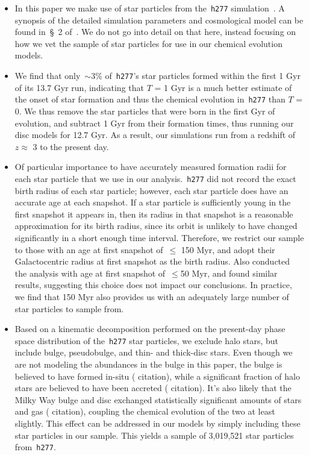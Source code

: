 \documentclass[fleqn, usenatbib]{mnras}
\begin{document}
\begin{itemize} 
	\item In this paper we make use of star particles from the~\texttt{h277} 
	simulation~\citep{Christensen2012, Zolotov2012, Loebman2012, Loebman2014, 
	Brooks2014}. A synopsis of the detailed simulation parameters and 
	cosmological model can be found in~\S~2 of~\citet{Bird2020}. We do not 
	go into detail on that here, instead focusing on how we vet the sample of 
	star particles for use in our chemical evolution models. 

	\item We find that only~$\sim$3\% of~\texttt{h277}'s star particles formed 
	within the first 1 Gyr of its 13.7 Gyr run, indicating that $T$ = 1 Gyr 
	is a much better estimate of the onset of star formation and thus the 
	chemical evolution in~\texttt{h277} than $T$ = 0. We thus remove the star 
	particles that were born in the first Gyr of evolution, and subtract 1 Gyr 
	from their formation times, thus running our disc models for 12.7 Gyr. As 
	a result, our simulations run from a redshift of~$z \approx$ 3 to the 
	present day. 

	\item Of particular importance to have accurately measured formation radii 
	for each star particle that we use in our analysis.~\texttt{h277} did not 
	record the exact birth radius of each star particle; however, each star 
	particle does have an accurate age at each snapshot. If a star particle 
	is sufficiently young in the first snapshot it appears in, then its 
	radius in that snapshot is a reasonable approximation for its birth 
	radius, since its orbit is unlikely to have changed significantly in a 
	short enough time interval. Therefore, we restrict our sample to those 
	with an age at first snapshot of~$\leq$ 150 Myr, and adopt their 
	Galactocentric radius at first snapshot as the birth radius. Also 
	conducted the analysis with age at first snapshot of~$\leq$50 Myr, and 
	found similar results, suggesting this choice does not impact our 
	conclusions. In practice, we find that 150 Myr also provides us with an 
	adequately large number of star particles to sample from. 

	\item Based on a kinematic decomposition performed on the present-day 
	phase space distribution of the~\texttt{h277} star particles, we exclude 
	halo stars, but include bulge, pseudobulge, and thin- and thick-disc 
	stars. Even though we are not modeling the abundances in the bulge in this 
	paper, the bulge is believed to have formed in-situ ({\color{red} 
	citation}), while a significant fraction of halo stars are believed to 
	have been accreted ({\color{red} citation}). It's also likely that the 
	Milky Way bulge and disc exchanged statistically significant amounts of 
	stars and gas ({\color{red} citation}), coupling the chemical evolution of 
	the two at least slightly. This effect can be addressed in our models by 
	simply including these star particles in our sample. This yields a sample 
	of 3,019,521 star particles from~\texttt{h277}. 


\end{itemize}
\end{document}
